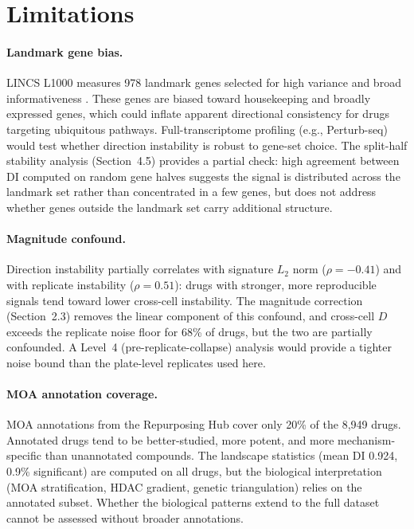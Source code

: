 \documentclass[11pt]{article}
\begin{document}
\section{Limitations}

\paragraph{Landmark gene bias.}
LINCS L1000 measures 978 landmark genes selected for high variance and
broad informativeness \citep{subramanian2017next}.  These genes are
biased toward housekeeping and broadly expressed genes, which could
inflate apparent directional consistency for drugs targeting ubiquitous
pathways.  Full-transcriptome profiling (e.g., Perturb-seq) would test
whether direction instability is robust to gene-set choice.  The
split-half stability analysis (Section~4.5) provides a partial check:
high agreement between DI computed on random gene halves suggests the
signal is distributed across the landmark set rather than concentrated
in a few genes, but does not address whether genes outside the landmark
set carry additional structure.

\paragraph{Magnitude confound.}
Direction instability partially correlates with signature $L_2$ norm
($\rho = -0.41$) and with replicate instability ($\rho = 0.51$): drugs
with stronger, more reproducible signals tend toward lower cross-cell
instability.  The magnitude correction (Section~2.3) removes the linear
component of this confound, and cross-cell $D$ exceeds the replicate
noise floor for 68\% of drugs, but the two are partially confounded.
A Level~4 (pre-replicate-collapse) analysis would provide a tighter
noise bound than the plate-level replicates used here.

\paragraph{MOA annotation coverage.}
MOA annotations from the Repurposing Hub cover only 20\% of the 8{,}949
drugs.  Annotated drugs tend to be better-studied, more potent, and more
mechanism-specific than unannotated compounds.  The landscape statistics
(mean DI 0.924, 0.9\% significant) are computed on all drugs, but the
biological interpretation (MOA stratification, HDAC gradient, genetic
triangulation) relies on the annotated subset.  Whether the biological
patterns extend to the full dataset cannot be assessed without
broader annotations.
\end{document}

